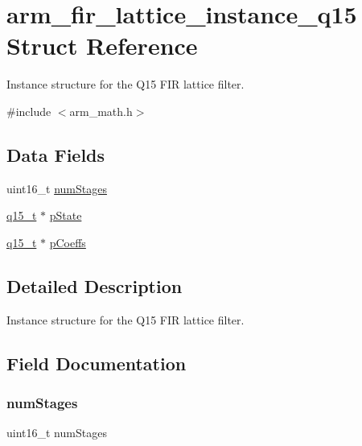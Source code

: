 \hypertarget{structarm__fir__lattice__instance__q15}{}\section{arm\+\_\+fir\+\_\+lattice\+\_\+instance\+\_\+q15 Struct Reference}
\label{structarm__fir__lattice__instance__q15}


Instance structure for the Q15 F\+IR lattice filter.  




{\ttfamily \#include $<$arm\+\_\+math.\+h$>$}

\subsection*{Data Fields}
\begin{DoxyCompactItemize}
\item 
uint16\+\_\+t \mbox{\hyperlink{structarm__fir__lattice__instance__q15_a4cceb90547b3e585d4c7aabaa8057212}{num\+Stages}}
\item 
\mbox{\hyperlink{arm__math_8h_ab5a8fb21a5b3b983d5f54f31614052ea}{q15\+\_\+t}} $\ast$ \mbox{\hyperlink{structarm__fir__lattice__instance__q15_ae29dfdb736374fcddaeaec4b7770170c}{p\+State}}
\item 
\mbox{\hyperlink{arm__math_8h_ab5a8fb21a5b3b983d5f54f31614052ea}{q15\+\_\+t}} $\ast$ \mbox{\hyperlink{structarm__fir__lattice__instance__q15_a7ca181a37f714d174445f486bebce26f}{p\+Coeffs}}
\end{DoxyCompactItemize}


\subsection{Detailed Description}
Instance structure for the Q15 F\+IR lattice filter. 

\subsection{Field Documentation}
\mbox{\label{structarm__fir__lattice__instance__q15_a4cceb90547b3e585d4c7aabaa8057212}} 
\subsubsection{\texorpdfstring{numStages}{numStages}}
{\footnotesize\ttfamily uint16\+\_\+t num\+Stages}

